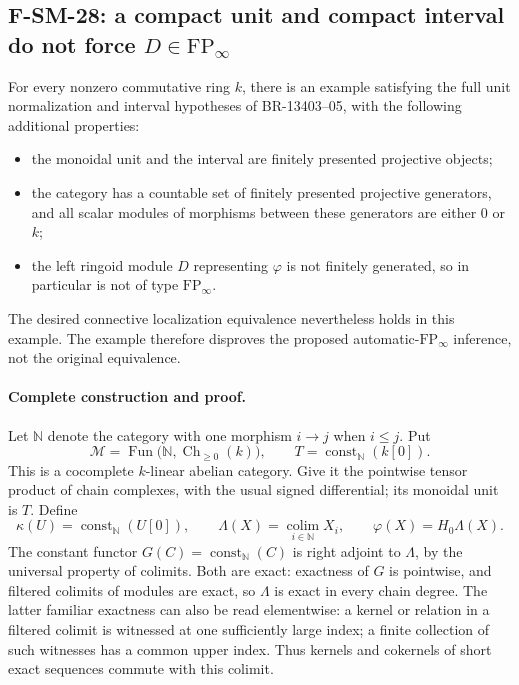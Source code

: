 \subsection{F-SM-28: a compact unit and compact interval do not force \(D\in\mathrm{FP}_\infty\)}
For every nonzero commutative ring \(k\), there is an example satisfying
the full unit normalization and interval hypotheses of BR-13403--05,
with the following additional properties:
\begin{itemize}
\item the monoidal unit and the interval are finitely presented
projective objects;
\item the category has a countable set of finitely presented projective
generators, and all scalar modules of morphisms between these generators
are either \(0\) or \(k\);
\item the left ringoid module \(D\) representing \(\varphi\) is not
finitely generated, so in particular is not of type
\(\mathrm{FP}_\infty\).
\end{itemize}
The desired connective localization equivalence nevertheless holds
in this example.  The example therefore disproves the proposed
automatic-\(\mathrm{FP}_\infty\) inference, not the original
equivalence.

\paragraph{Complete construction and proof.}
Let \(\mathbb N\) denote the category with one morphism \(i\to j\)
when \(i\le j\).  Put
\[
 \mathcal M=\operatorname{Fun}
     \bigl(\mathbb N,\operatorname{Ch}_{\ge0}(k)\bigr),
 \qquad
 T=\operatorname{const}_{\mathbb N}(k[0]).
 \tag{SM28.1}
\]
This is a cocomplete \(k\)-linear abelian category.  Give it the
pointwise tensor product of chain complexes, with the usual signed
differential; its monoidal unit is \(T\).  Define
\[
 \kappa(U)=\operatorname{const}_{\mathbb N}(U[0]),\qquad
 \Lambda(X)=\operatorname*{colim}_{i\in\mathbb N}X_i,\qquad
 \varphi(X)=H_0\Lambda(X).
 \tag{SM28.2}
\]
The constant functor \(G(C)=\operatorname{const}_{\mathbb N}(C)\)
is right adjoint to \(\Lambda\), by the universal property of colimits.
Both are exact: exactness of \(G\) is pointwise, and filtered colimits
of modules are exact, so \(\Lambda\) is exact in every chain degree.
The latter familiar exactness can also be read elementwise: a kernel
or relation in a filtered colimit is witnessed at one sufficiently
large index; a finite collection of such witnesses has a common
upper index.  Thus kernels and cokernels of short exact sequences
commute with this colimit.

